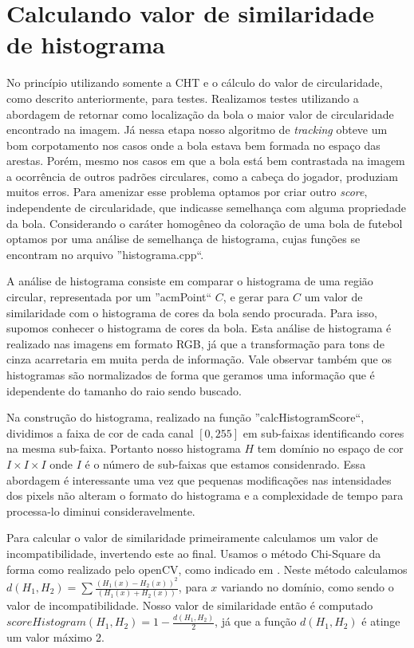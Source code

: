 \documentclass[11pt,a4paper]{article}
\begin{document}
\section{Calculando valor de similaridade de histograma}

 No princípio utilizando somente a CHT e o cálculo do valor de circularidade, como descrito anteriormente, para testes. Realizamos testes utilizando a abordagem de retornar como localização da bola o maior valor de circularidade encontrado na imagem. Já nessa etapa nosso algoritmo de \textit{tracking} obteve um bom corpotamento nos casos onde a bola estava bem formada no espaço das arestas. Porém, mesmo nos casos em que a bola está bem contrastada na imagem a ocorrência de outros padrões circulares, como a cabeça do jogador, produziam muitos erros. Para amenizar esse problema optamos por criar outro \textit{score}, independente de circularidade, que indicasse semelhança com alguma propriedade da bola. Considerando o caráter homogêneo da coloração de uma bola de futebol optamos por uma análise de semelhança de histograma, cujas funções se encontram no arquivo ''histograma.cpp``.

 A análise de histograma consiste em comparar o histograma de uma região circular, representada por um ''acmPoint`` $C$, e gerar para $C$ um valor de similaridade com o histograma de cores da bola sendo procurada. Para isso, supomos conhecer o histograma de cores da bola. Esta análise de histograma é realizado nas imagens em formato RGB, já que a transformação para tons de cinza acarretaria em muita perda de informação. Vale observar também que os histogramas são normalizados de forma que geramos uma informação que é idependente do tamanho do raio sendo buscado.

 Na construção do histograma, realizado na função ''calcHistogramScore``, dividimos a faixa de cor de cada canal $[0,255]$ em sub-faixas identificando cores na mesma sub-faixa. Portanto nosso histograma $H$ tem domínio no espaço de cor $I\times I\times I$ onde $I$ é o número de sub-faixas que estamos considenrado. Essa abordagem é interessante uma vez que pequenas modificações nas intensidades dos pixels não alteram o formato do histograma e a complexidade de tempo para processa-lo diminui consideravelmente.

 Para calcular o valor de similaridade primeiramente calculamos um valor de incompatibilidade, invertendo este ao final. Usamos o método Chi-Square da forma como realizado pelo openCV, como indicado em \cite{OCVManual}. Neste método calculamos $d(H_1,H_2) = \sum{\frac{(H_1(x) - H_2(x))^2}{(H_1(x) + H_2(x))} }$, para $x$ variando no domínio, como sendo o valor de incompatibilidade. Nosso valor de similaridade então é computado $scoreHistogram(H_1,H_2) = 1 - \frac{d(H_1,H_2)}{2}$, já que a função $d(H_1,H_2)$ é atinge um valor máximo 2.
\end{document}
